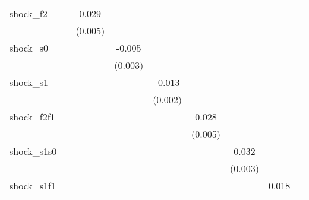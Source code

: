 {\begin{tabular}{l*{8}{c}}
\addlinespace
shock\_f2    &                     &       0.029\sym{***}&                     &                     &                     &                     &                     &                     \\
            &                     &     (0.005)         &                     &                     &                     &                     &                     &                     \\
\addlinespace
shock\_s0    &                     &                     &      -0.005         &                     &                     &                     &                     &                     \\
            &                     &                     &     (0.003)         &                     &                     &                     &                     &                     \\
\addlinespace
shock\_s1    &                     &                     &                     &      -0.013\sym{***}&                     &                     &                     &                     \\
            &                     &                     &                     &     (0.002)         &                     &                     &                     &                     \\
\addlinespace
shock\_f2f1  &                     &                     &                     &                     &       0.028\sym{***}&                     &                     &                     \\
            &                     &                     &                     &                     &     (0.005)         &                     &                     &                     \\
\addlinespace
shock\_s1s0  &                     &                     &                     &                     &                     &       0.032\sym{***}&                     &                     \\
            &                     &                     &                     &                     &                     &     (0.003)         &                     &                     \\
\addlinespace
shock\_s1f1  &                     &                     &                     &                     &                     &                     &       0.018\sym{***}&                     \\

\end{tabular}}
